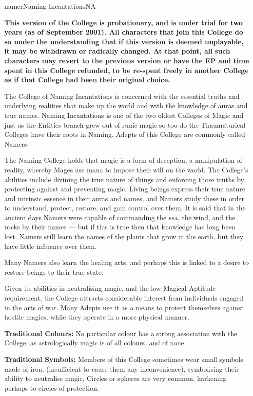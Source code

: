 \begin{college}[2.0]{namer}{Naming Incantations}{NA}

\textbf{This version of the College is probationary, and is under
trial for two years (as of September 2001).  All characters that join
this College do so under the understanding that if this version is
deemed unplayable, it may be withdrawn or radically changed.  At that
point, all such characters may revert to the previous version or have
the EP and time spent in this College refunded, to be re-spent freely
in another College as if that College had been their original choice.}

The College of Naming Incantations is concerned with the essential
truths and underlying realities that make up the world and with the
knowledge of auras and true names.  Naming Incantations is one of the
two oldest Colleges of Magic and just as the Entities branch grew out
of runic magic so too do the Thaumaturical Colleges have their roots
in Naming.  Adepts of this College are commonly called Namers.

The Naming College holds that magic is a form of deception, a
manipulation of reality, whereby Mages use mana to impose their will
on the world. The College's abilities include divining the true nature
of things and enforcing those truths by protecting against and
preventing magic.  Living beings express their true nature and
intrinsic essence in their auras and names, and Namers study these in
order to understand, protect, restore, and gain control over them. It
is said that in the ancient days Namers were capable of commanding the
sea, the wind, and the rocks by their names --- but if this is true
then that knowledge has long been lost. Namers still learn the names
of the plants that grow in the earth, but they have little influence
over them.

Many Namers also learn the healing arts, and perhaps this is linked to
a desire to restore beings to their true state.

Given its abilities in neutralising magic, and the low Magical
Aptitude requirement, the College attracts considerable interest from
individuals engaged in the arts of war. Many Adepts use it as a means
to protect themselves against hostile magics, while they operate in a
more physical manner.

\textbf{Traditional Colours:} No particular colour has a strong
association with the College, as astrologically magic is of all
colours, and of none.

\textbf{Traditional Symbols:} Members of this College sometimes wear
small symbols made of iron, (insufficient to cause them any
inconvenience), symbolising their ability to neutralise magic. Circles
or spheres are very common, harkening perhaps to circles of
protection.


\end{college}
